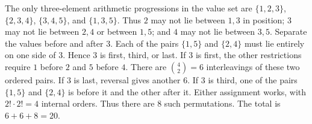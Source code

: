 The only three-element arithmetic progressions in the value set are $\{1,2,3\}$, $\{2,3,4\}$, $\{3,4,5\}$, and $\{1,3,5\}$. Thus $2$ may not lie between $1,3$ in position; $3$ may not lie between $2,4$ or between $1,5$; and $4$ may not lie between $3,5$.
Separate the values before and after $3$. Each of the pairs $\{1,5\}$ and $\{2,4\}$ must lie entirely on one side of $3$. Hence $3$ is first, third, or last.
If $3$ is first, the other restrictions require $1$ before $2$ and $5$ before $4$. There are $\binom42=6$ interleavings of these two ordered pairs. If $3$ is last, reversal gives another $6$.
If $3$ is third, one of the pairs $\{1,5\}$ and $\{2,4\}$ is before it and the other after it. Either assignment works, with $2!\cdot2!=4$ internal orders. Thus there are $8$ such permutations.
The total is $\boxed{6+6+8=20}$.
